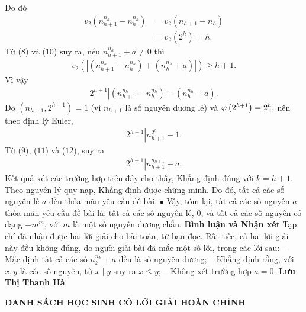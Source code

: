 \begin{multicols}{2}
	\vskip 0.05cm
	Do đó
	\begin{align*}
		{v_2}\left( {n_{h + 1}^{{n_h}} - n_h^{{n_h}}} \right) &= {v_2}\left( {{n_{h + 1}} - {n_h}} \right) \\
		&= {v_2}\left( {{2^h}} \right) = h. \tag{$10$}
	\end{align*}
	Từ ($8$) và ($10$) suy ra, nếu  $n_{h + 1}^{{n_h}} + a \ne 0$ thì
	\begin{align*}
		{v_2}\left( {\left| {\left( {n_{h + 1}^{{n_h}} - n_h^{{n_h}}} \right) + \left( {n_h^{{n_h}} + a} \right)} \right|} \right) \ge h + 1.
	\end{align*}
	Vì vậy
	\begin{align*}
		{2^{h + 1}}\left| {\left( {n_{h + 1}^{{n_h}} - n_h^{{n_h}}} \right) + \left( {n_h^{{n_h}} + a} \right)} \right.. \tag{$11$}
	\end{align*}
	Do $\left( {{n_{h + 1}},{2^{h + 1}}} \right) = 1$  (vì ${n_{h + 1}}$  là số nguyên dương lẻ) và ${\rm{\varphi }}\left( {{2^{h + 1}}} \right) = {2^h},$  nên theo định lý Euler,
	\begin{align*}
		{2^{h + 1}}\left| {n_{h + 1}^{{2^h}} - 1} \right..\tag{$12$}
	\end{align*}
	Từ ($9$), ($11$) và ($12$), suy ra
	\begin{align*}
		{2^{h + 1}}\left| {n_{h + 1}^{{n_{h + 1}}} + a} \right..
	\end{align*}
	Kết quả xét các trường hợp trên đây cho thấy, Khẳng định đúng với $k = h + 1$.
	\vskip 0.05cm
	Theo nguyên lý quy nạp, Khẳng định được chứng minh.
	\vskip 0.05cm
	Do đó, tất cả các số nguyên lẻ $a$ đều thỏa mãn yêu cầu đề bài.
	\vskip 0.05cm
	$\bullet$ Vậy, tóm lại, tất cả các số nguyên $a$ thỏa mãn yêu cầu đề bài là: tất cả các số nguyên lẻ, $0$, và tất cả các số nguyên có dạng $-m^m$, với $m$ là một số nguyên dương chẵn.
	\vskip 0.05cm
	\textbf{\color{thachthuctoanhoc}Bình luận và Nhận xét}
	\vskip 0.05cm
	Tạp chí đã nhận được hai lời giải cho bài toán, từ bạn đọc. Rất tiếc, cả hai lời giải này đều không đúng, do người giải bài đã mắc một số lỗi, trong các lỗi sau:
	\vskip 0.05cm
	-- Mặc định tất cả các số $n_k^{{n_k}} + a$  đều là số nguyên dương;
	\vskip 0.05cm
	-- Khẳng định rằng, với $x, y$ là các số nguyên, từ $x \mid y$ suy ra $x \le y$;
	\vskip 0.05cm
	-- Không xét trường hợp $a = 0$.
	\vskip 0.15cm
	\hfill\textbf{\color{thachthuctoanhoc}Lưu Thị Thanh Hà}
	\vskip 0.05cm
\end{multicols}
\begin{center}
	\textbf{\color{thachthuctoanhoc}DANH SÁCH HỌC SINH CÓ LỜI GIẢI HOÀN CHỈNH}
\end{center}
